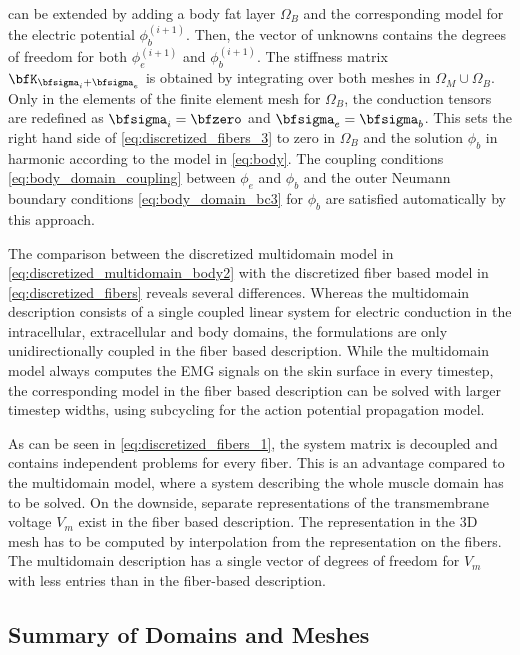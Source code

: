  can be extended by adding a body fat layer $\Omega_B$ and the corresponding model for the electric potential $\phi_b^{(i+1)}$. Then, the vector of unknowns contains the degrees of freedom for both $\phi_e^{(i+1)}$ and $\phi_b^{(i+1)}$. The stiffness matrix $\bfK_{\bfsigma_i + \bfsigma_e}$ is obtained by integrating over both meshes in $\Omega_M \cup \Omega_B$. Only in the elements of the finite element mesh for $\Omega_B$, the conduction tensors are redefined as $\bfsigma_i = \bfzero$ and $\bfsigma_e = \bfsigma_b$. This sets the right hand side of \cref{eq:discretized_fibers_3} to zero in $\Omega_B$ and the solution $\phi_b$ in harmonic according to the model in \cref{eq:body}. The coupling conditions \cref{eq:body_domain_coupling} between $\phi_e$ and $\phi_b$ and the outer Neumann boundary conditions \cref{eq:body_domain_bc3} for $\phi_b$ are satisfied automatically by this approach.

The comparison between the discretized multidomain model in \cref{eq:discretized_multidomain_body2} with the discretized fiber based model in \cref{eq:discretized_fibers} reveals several differences. Whereas the multidomain description consists of a single coupled linear system for electric conduction in the intracellular, extracellular and body domains, the formulations are only unidirectionally coupled in the fiber based description. While the multidomain model always computes the EMG signals on the skin surface in every timestep, the corresponding model in the fiber based description can be solved with larger timestep widths, using subcycling for the action potential propagation model.

As can be seen in \cref{eq:discretized_fibers_1}, the system matrix is decoupled and contains independent problems for every fiber. This is an advantage compared to the multidomain model, where a system describing the whole muscle domain has to be solved. On the downside, separate representations of the transmembrane voltage $V_m$ exist in the fiber based description. The representation in the 3D mesh has to be computed by interpolation from the representation on the fibers. The multidomain description has a single vector of degrees of freedom for $V_m$ with less entries than in the fiber-based description.

\subsection{Summary of Domains and Meshes}

